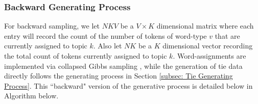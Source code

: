                   \subsubsection{Backward Generating Process} \label{subsubsec: Backward Generative Process}
        For backward sampling, we let $NKV$ be a $V\times K$ dimensional matrix where each entry will record the count of the number of tokens of word-type $v$ that are currently assigned to topic $k$. Also let $NK$ be a $K$ dimensional vector recording the total count of tokens currently assigned to topic $k$. Word-assignments are implemented via collapsed Gibbs sampling \citep{griffiths2002gibbs}, while the generation of tie data directly follows the generating process in Section \ref{subsec: Tie Generating Process}. This ``backward" version of the generative process is detailed below in Algorithm below.
